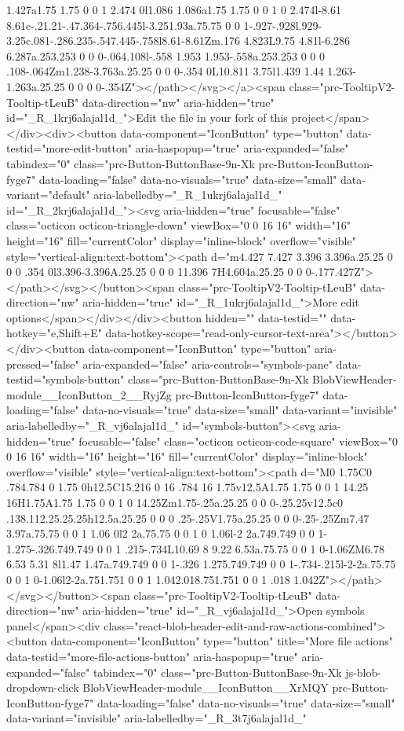 {{{{{{{1.427a1.75 1.75 0 0 1 2.474 0l1.086 1.086a1.75 1.75 0 0 1 0 2.474l-8.61 8.61c-.21.21-.47.364-.756.445l-3.251.93a.75.75 0 0 1-.927-.928l.929-3.25c.081-.286.235-.547.445-.758l8.61-8.61Zm.176 4.823L9.75 4.81l-6.286 6.287a.253.253 0 0 0-.064.108l-.558 1.953 1.953-.558a.253.253 0 0 0 .108-.064Zm1.238-3.763a.25.25 0 0 0-.354 0L10.811 3.75l1.439 1.44 1.263-1.263a.25.25 0 0 0 0-.354Z"></path></svg></a><span class="prc-TooltipV2-Tooltip-tLeuB" data-direction="nw" aria-hidden="true" id="_R_1krj6alajal1d_">Edit the file in your fork of this project</span></div><div><button data-component="IconButton" type="button" data-testid="more-edit-button" aria-haspopup="true" aria-expanded="false" tabindex="0" class="prc-Button-ButtonBase-9n-Xk prc-Button-IconButton-fyge7" data-loading="false" data-no-visuals="true" data-size="small" data-variant="default" aria-labelledby="_R_1ukrj6alajal1d_" id="_R_2krj6alajal1d_"><svg aria-hidden="true" focusable="false" class="octicon octicon-triangle-down" viewBox="0 0 16 16" width="16" height="16" fill="currentColor" display="inline-block" overflow="visible" style="vertical-align:text-bottom"><path d="m4.427 7.427 3.396 3.396a.25.25 0 0 0 .354 0l3.396-3.396A.25.25 0 0 0 11.396 7H4.604a.25.25 0 0 0-.177.427Z"></path></svg></button><span class="prc-TooltipV2-Tooltip-tLeuB" data-direction="nw" aria-hidden="true" id="_R_1ukrj6alajal1d_">More edit options</span></div></div><button hidden="" data-testid="" data-hotkey="e,Shift+E" data-hotkey-scope="read-only-cursor-text-area"></button></div><button data-component="IconButton" type="button" aria-pressed="false" aria-expanded="false" aria-controls="symbols-pane" data-testid="symbols-button" class="prc-Button-ButtonBase-9n-Xk BlobViewHeader-module__IconButton_2__RyjZg prc-Button-IconButton-fyge7" data-loading="false" data-no-visuals="true" data-size="small" data-variant="invisible" aria-labelledby="_R_vj6alajal1d_" id="symbols-button"><svg aria-hidden="true" focusable="false" class="octicon octicon-code-square" viewBox="0 0 16 16" width="16" height="16" fill="currentColor" display="inline-block" overflow="visible" style="vertical-align:text-bottom"><path d="M0 1.75C0 .784.784 0 1.75 0h12.5C15.216 0 16 .784 16 1.75v12.5A1.75 1.75 0 0 1 14.25 16H1.75A1.75 1.75 0 0 1 0 14.25Zm1.75-.25a.25.25 0 0 0-.25.25v12.5c0 .138.112.25.25.25h12.5a.25.25 0 0 0 .25-.25V1.75a.25.25 0 0 0-.25-.25Zm7.47 3.97a.75.75 0 0 1 1.06 0l2 2a.75.75 0 0 1 0 1.06l-2 2a.749.749 0 0 1-1.275-.326.749.749 0 0 1 .215-.734L10.69 8 9.22 6.53a.75.75 0 0 1 0-1.06ZM6.78 6.53 5.31 8l1.47 1.47a.749.749 0 0 1-.326 1.275.749.749 0 0 1-.734-.215l-2-2a.75.75 0 0 1 0-1.06l2-2a.751.751 0 0 1 1.042.018.751.751 0 0 1 .018 1.042Z"></path></svg></button><span class="prc-TooltipV2-Tooltip-tLeuB" data-direction="nw" aria-hidden="true" id="_R_vj6alajal1d_">Open symbols panel</span><div class="react-blob-header-edit-and-raw-actions-combined"><button data-component="IconButton" type="button" title="More file actions" data-testid="more-file-actions-button" aria-haspopup="true" aria-expanded="false" tabindex="0" class="prc-Button-ButtonBase-9n-Xk js-blob-dropdown-click BlobViewHeader-module__IconButton__XrMQY prc-Button-IconButton-fyge7" data-loading="false" data-no-visuals="true" data-size="small" data-variant="invisible" aria-labelledby="_R_3t7j6alajal1d_" }}}}}}}
